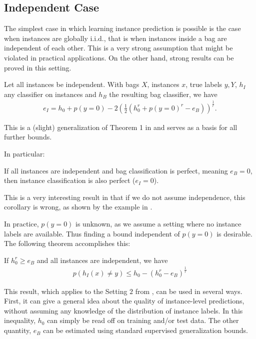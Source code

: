 \subsection{Independent Case}
The simplest case in which learning instance prediction is possible is the case when instances are globally i.i.d.,
that is when instances inside a bag are independent of each other. This is a very strong assumption that might be
violated in practical applications. On the other hand, strong results can be proved in this setting.

\begin{theorem}\label{basicthm}
Let all instances be independent. With bags $X$, instances $x$, true labels $y,Y$, $h_I$ any classifier
on instances and $h_B$ the resulting bag classifier, we have
\begin{align*}
   e_I = h_0 + p(y=0) - 2 \left (\frac{1}{2} ( h_0^r + p(y=0)^r - e_B) \right)^\frac{1}{r}.
\end{align*}
\end{theorem}
This is a (slight) generalization of Theorem 1 in \citet{sabato2010reducing} and serves as a basis for all further bounds. 

In particular:
\begin{corollary}\label{perfect}
If all instances are independent and bag classification is perfect, meaning $e_B=0$, then instance classification is also perfect ($e_I =0$).
\end{corollary}
This is a very interesting result in that if we do not assume independence, this corollary is wrong,
as shown by the example in .

In practice, $p(y=0)$ is unknown, as we assume a setting where no instance labels are available.
Thus finding a bound independent of $p(y=0)$ is desirable. The following theorem accomplishes this:

\begin{theorem}\label{iidbound}
If $h_0^r  \geq e_B$ and all instances are independent, we have
\begin{align}
    p(h_I(x)\neq y) \leq h_0 - \left ( h_0^r - e_B \right ) ^ \frac{1}{r}
\end{align}
\end{theorem}

This result, which applies to the Setting $2$ from ,
can be used in several ways. First, it can give a general idea about the quality of instance-level
predictions, without assuming any knowledge of the distribution of instance labels. In this inequality,
$h_0$ can simply be read off on training and/or test data. The other quantity, $e_B$ can be
estimated using standard supervised generalization bounds.

